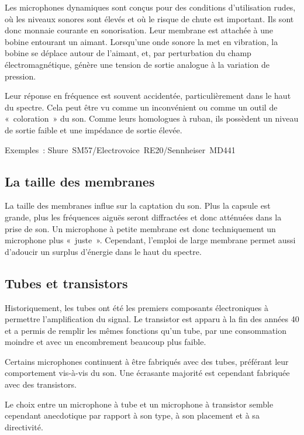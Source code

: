 \documentclass[
]{book}
\begin{document}
Les microphones dynamiques sont conçus pour des conditions d'utilisation rudes, où les niveaux sonores sont élevés et où le risque de chute est important. Ils sont donc monnaie courante en sonorisation. Leur membrane est attachée à une bobine entourant un aimant. Lorsqu'une onde sonore la met en vibration, la bobine se déplace autour de l'aimant, et, par perturbation du champ électromagnétique, génère une tension de sortie analogue à la variation de pression.

Leur réponse en fréquence est souvent accidentée, particulièrement dans le haut du spectre. Cela peut être vu comme un inconvénient ou comme un outil de «~coloration~» du son. Comme leurs homologues à ruban, ils possèdent un niveau de sortie faible et une impédance de sortie élevée.

Exemples~: Shure~SM57/Electrovoice~RE20/Sennheiser~MD441

\hypertarget{la-taille-des-membranes}{%
\subsection{La taille des membranes}\label{la-taille-des-membranes}}

La taille des membranes influe sur la captation du son. Plus la capsule est grande, plus les fréquences aiguës seront diffractées et donc atténuées dans la prise de son. Un microphone à petite membrane est donc techniquement un microphone plus «~juste~». Cependant, l'emploi de large membrane permet aussi d'adoucir un surplus d'énergie dans le haut du spectre.

\hypertarget{tubes-et-transistors}{%
\subsection{Tubes et transistors}\label{tubes-et-transistors}}

Historiquement, les tubes ont été les premiers composants électroniques à permettre l'amplification du signal. Le transistor est apparu à la fin des années 40 et a permis de remplir les mêmes fonctions qu'un tube, par une consommation moindre et avec un encombrement beaucoup plus faible.

Certains microphones continuent à être fabriqués avec des tubes, préférant leur comportement vis-à-vis du son. Une écrasante majorité est cependant fabriquée avec des transistors.

Le choix entre un microphone à tube et un microphone à transistor semble cependant anecdotique par rapport à son type, à son placement et à sa directivité.
\end{document}
